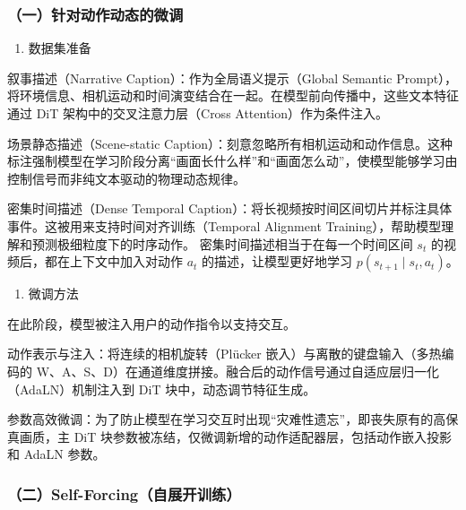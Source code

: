 \hypertarget{ux4e00ux9488ux5bf9ux52a8ux4f5cux52a8ux6001ux7684ux5faeux8c03}{%
\subsubsection{（一）针对动作动态的微调}\label{ux4e00ux9488ux5bf9ux52a8ux4f5cux52a8ux6001ux7684ux5faeux8c03}}

\begin{enumerate}
\def\labelenumi{\arabic{enumi}.}
\tightlist
\item
  数据集准备
\end{enumerate}

叙事描述（Narrative Caption）：作为全局语义提示（Global Semantic Prompt），将环境信息、相机运动和时间演变结合在一起。在模型前向传播中，这些文本特征通过 DiT 架构中的交叉注意力层（Cross Attention）作为条件注入。

场景静态描述（Scene-static Caption）：刻意忽略所有相机运动和动作信息。这种标注强制模型在学习阶段分离``画面长什么样''和``画面怎么动''，使模型能够学习由控制信号而非纯文本驱动的物理动态规律。

密集时间描述（Dense Temporal Caption）：将长视频按时间区间切片并标注具体事件。这被用来支持时间对齐训练（Temporal Alignment Training），帮助模型理解和预测极细粒度下的时序动作。
密集时间描述相当于在每一个时间区间 \(s_t\) 的视频后，都在上下文中加入对动作 \(a_t\) 的描述，让模型更好地学习 \(p(s_{t+1}\mid s_t,a_t)\)。

\begin{enumerate}
\def\labelenumi{\arabic{enumi}.}
\setcounter{enumi}{1}
\tightlist
\item
  微调方法
\end{enumerate}

在此阶段，模型被注入用户的动作指令以支持交互。

动作表示与注入：将连续的相机旋转（Plücker 嵌入）与离散的键盘输入（多热编码的 W、A、S、D）在通道维度拼接。融合后的动作信号通过自适应层归一化（AdaLN）机制注入到 DiT 块中，动态调节特征生成。

参数高效微调：为了防止模型在学习交互时出现``灾难性遗忘''，即丧失原有的高保真画质，主 DiT 块参数被冻结，仅微调新增的动作适配器层，包括动作嵌入投影和 AdaLN 参数。

\hypertarget{ux4e8cself-forcingux81eaux5c55ux5f00ux8badux7ec3}{%
\subsubsection{（二）Self-Forcing（自展开训练）}\label{ux4e8cself-forcingux81eaux5c55ux5f00ux8badux7ec3}}

